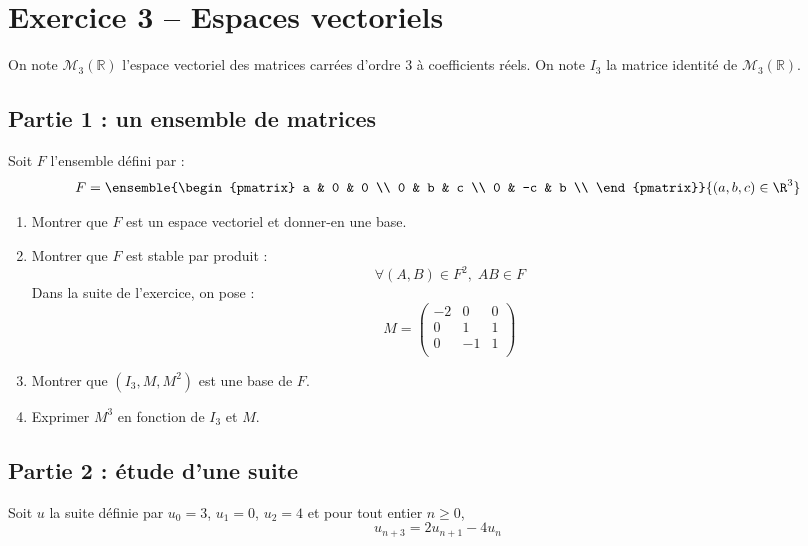 \documentclass[twoside,french,11pt]{VcCours}
\begin{document}
  
\section*{Exercice 3 -- Espaces vectoriels}
On note $\mathcal{M}_3(\mathbb{R})$ l'espace vectoriel des matrices carrées 
d'ordre $3$ à coefficients réels. On note $I_3$ la matrice identité de 
$\mathcal{M}_3(\mathbb{R})$.

\subsection*{Partie 1 : un ensemble de matrices}
Soit $F$ l'ensemble défini par :
$$ F = \ensemble{\begin{pmatrix}
a & 0 & 0 \\
0 & b & c \\
0 & -c & b \\
\end{pmatrix}}{(a,b,c) \in \R^3}$$

\begin{enumerate}
\item Montrer que $F$ est un espace vectoriel et donner-en une base.
\item Montrer que $F$ est stable par produit :
$$ \forall (A,B) \in F^2, \; AB \in F$$
Dans la suite de l'exercice, on pose :
$$ M = \begin{pmatrix}
-2 & 0 & 0 \\
0 & 1 & 1 \\
0 & -1 & 1 \\
\end{pmatrix}$$
\item Montrer que $(I_3,M,M^2)$ est une base de $F$.
\item Exprimer $M^3$ en fonction de $I_3$ et $M$.
\end{enumerate}


\subsection*{Partie 2 : étude d'une suite}


Soit $u$ la suite définie par $u_0=3$, $u_1=0$, $u_2=4$ et pour tout entier $n \geq 0$,
$$ u_{n+3}= 2u_{n+1}-4u_n$$

\medskip
\end{document}
